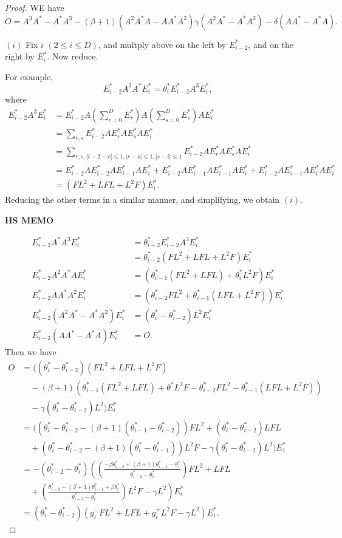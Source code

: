 \documentclass[
]{book}
\theoremstyle{definition}
\theoremstyle{definition}
\theoremstyle{definition}
\theoremstyle{definition}
\theoremstyle{remark}
\begin{document}
\begin{proof}

WE have
\[O = A^3A^*-A^*A^3 - (\beta+1)(A^2A^*A-AA^*A^2)\gamma(A^2A^*-A^*A^2)-\delta(AA^*-A^*A).\]

\((i)\) Fix \(i\) \((2\leq i\leq D)\), and multply above on the left by \(E^*_{i-2}\), and on the right by \(E^*_i\). Now reduce.

For example,
\[E^*_{i-2}A^3A^*E^*_i = \theta^*_i E^*_{i-2}A^3 E^*_i,\]
where
\begin{align}
E^*_{i-2}A^3 E^*_i & = E^*_{i-2}A\left(\sum_{r=0}^D E^*_r\right)A\left(\sum_{s=0}^D E^*_s\right)AE^*_i\\
& = \sum_{r,s}E^*_{i-2}AE^*_r AE^*_s AE^*_i\\
& = \sum_{r,s, |i-2-r|\leq 1, |r-s|\leq 1, |s-i|\leq 1}E^*_{i-2}AE^*_r AE^*_s AE^*_i\\
& = E^*_{i-2}AE^*_{i-2}AE^*_{i-1}AE^*_i + E^*_{i-2}AE^*_{i-1}AE^*_{i-1}AE^*_i + E^*_{i-2}AE^*_{i-1}AE^*_{i}AE^*_i\\
& = (FL^2 + LFL + L^2F)E^*_i.
\end{align}
Reducing the other terms in a similar manner, and simplifying, we obtain \((i)\).

\textbf{HS MEMO}

\begin{align}
E^*_{i-2}A^*A^3E^*_i & = \theta^*_{i-2}E^*_{i-2}A^3E^*_i\\
& = \theta^*_{i-2}(FL^2+LFL + L^2F)E^*_i\\
E^*_{i-2}A^2A^*AE^*_i & = (\theta^*_{i-1}(FL^2+LFL) + \theta^*_iL^2F)E^*_i\\
E^*_{i-2}AA^*A^2E^*_i & = (\theta^*_{i-2}FL^2 + \theta^*_{i-1}(LFL+L^2F))E^*_i\\
E^*_{i-2}(A^2A^*-A^*A^2)E^*_i & = (\theta^*_i-\theta^*_{i-2})L^2E^*_i\\
E^*_{i-2}(AA^*-A^*A)E^*_i & = O.
\end{align}
Then we have
\begin{align}
O &= ((\theta^*_i-\theta^*_{i-2})(FL^2+LFL+L^2F)\\
& \quad -(\beta+1)(\theta^*_{i-1}(FL^2+LFL) + \theta^* L^2F - \theta^*_{i-2}FL^2 - \theta^*_{i-1}(LFL+L^2F)) \\
& \quad -\gamma(\theta^*_i-\theta^*_{i-2})L^2)E^*_i\\
& = ((\theta^*_i-\theta^*_{i-2}-(\beta+1)(\theta^*_{i-1}-\theta^*_{i-2}))FL^2 + (\theta^*_i-\theta^*_{i-2})LFL\\
& \quad + (\theta^*_i-\theta^*_{i-2}-(\beta+1)(\theta^*_i-\theta^*_{i-1}))L^2F - \gamma(\theta^*_i-\theta^*_{i-2})L^2)E^*_1\\
& = -(\theta^*_{i-2}-\theta^*_i)\left(\left(\frac{-\beta \theta^*_{i-2}+(\beta+1)\theta^*_{i-1}-\theta^*_i}{\theta^*_{i-2}-\theta^*_i}\right)FL^2+LFL\right.\\
& \quad + \left. \left(\frac{\theta^*_{i-2}-(\beta+1)\theta^*_{i-1}+\beta \theta^*_i}{\theta^*_{i-2}-\theta^*_i}\right)L^2F - \gamma L^2\right)E^*_i\\
& = (\theta^*_i-\theta^*_{i-2})(g^-_iFL^2 + LFL + g^+_iL^2F - \gamma L^2)E^*_i.
\end{align}


\end{proof}
\end{document}
